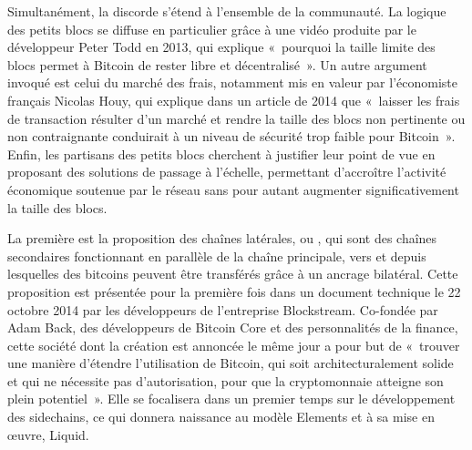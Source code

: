 Simultanément, la discorde s'étend à l'ensemble de la communauté. La logique des petits blocs se diffuse en particulier grâce à une vidéo produite par le développeur Peter Todd en 2013, qui explique «~pourquoi la taille limite des blocs permet à Bitcoin de rester libre et décentralisé~». Un autre argument invoqué est celui du marché des frais, notamment mis en valeur par l'économiste français Nicolas Houy, qui explique dans un article de 2014 que «~laisser les frais de transaction résulter d'un marché et rendre la taille des blocs non pertinente ou non contraignante conduirait à un niveau de sécurité trop faible pour Bitcoin~». Enfin, les partisans des petits blocs cherchent à justifier leur point de vue en proposant des solutions de passage à l'échelle, permettant d'accroître l'activité économique soutenue par le réseau sans pour autant augmenter significativement la taille des blocs.

La première est la proposition des chaînes latérales, ou , qui sont des chaînes secondaires fonctionnant en parallèle de la chaîne principale, vers et depuis lesquelles des bitcoins peuvent être transférés grâce à un ancrage bilatéral. Cette proposition est présentée pour la première fois dans un document technique le 22 octobre 2014 par les développeurs de l'entreprise Blockstream. Co-fondée par Adam Back, des développeurs de Bitcoin Core et des personnalités de la finance, cette société dont la création est annoncée le même jour a pour but de «~trouver une manière d'étendre l'utilisation de Bitcoin, qui soit architecturalement solide et qui ne nécessite pas d'autorisation, pour que la cryptomonnaie atteigne son plein potentiel~». Elle se focalisera dans un premier temps sur le développement des sidechains, ce qui donnera naissance au modèle Elements et à sa mise en œuvre, Liquid.

